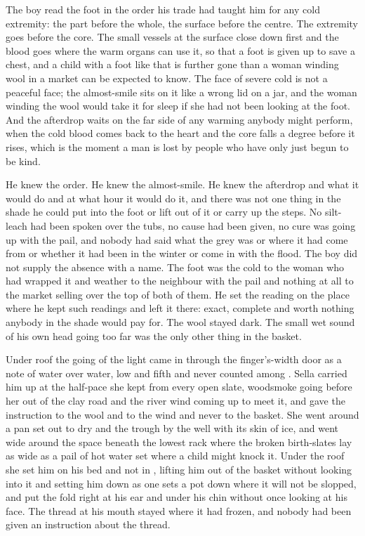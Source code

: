 The boy read the foot in the order his trade had taught him for any cold extremity: the part before the whole, the surface before the centre. The extremity goes before the core. The small vessels at the surface close down first and the blood goes where the warm organs can use it, so that a foot is given up to save a chest, and a child with a foot like that is further gone than a woman winding wool in a market can be expected to know. The face of severe cold is not a peaceful face; the almost-smile sits on it like a wrong lid on a jar, and the woman winding the wool would take it for sleep if she had not been looking at the foot. And the afterdrop waits on the far side of any warming anybody might perform, when the cold blood comes back to the heart and the core falls a degree before it rises, which is the moment a man is lost by people who have only just begun to be kind.

He knew the order. He knew the almost-smile. He knew the afterdrop and what it would do and at what hour it would do it, and there was not one thing in the shade he could put into the foot or lift out of it or carry up the steps. No silt-leach had been spoken over the tubs, no cause had been given, no cure was going up with the pail, and nobody had said what the grey was or where it had come from or whether it had been in the winter or come in with the flood. The boy did not supply the absence with a name. The foot was the cold to the woman who had wrapped it and weather to the neighbour with the pail and nothing at all to the market selling over the top of both of them. He set the reading on the place where he kept such readings and left it there: exact, complete and worth nothing anybody in the shade would pay for. The wool stayed dark. The small wet sound of his own head going too far was the only other thing in the basket.

\scenebreak

Under  roof the going of the light came in through the finger's-width door as a note of water over water, low and fifth and never counted among . Sella carried him up at the half-pace she kept from every open slate, woodsmoke going before her out of the clay road and the river wind coming up to meet it, and gave the instruction to the wool and to the wind and never to the basket. She went around a pan set out to dry and the trough by the well with its skin of ice, and went wide around the space beneath the lowest rack where the broken birth-slates lay as wide as a pail of hot water set where a child might knock it. Under the roof she set him on his bed and not in , lifting him out of the basket without looking into it and setting him down as one sets a pot down where it will not be slopped, and put the fold right at his ear and under his chin without once looking at his face. The thread at his mouth stayed where it had frozen, and nobody had been given an instruction about the thread.


